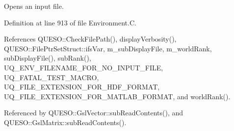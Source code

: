 Opens an input file. 



Definition at line 913 of file Environment.\-C.



References Q\-U\-E\-S\-O\-::\-Check\-File\-Path(), display\-Verbosity(), Q\-U\-E\-S\-O\-::\-File\-Ptr\-Set\-Struct\-::ifs\-Var, m\-\_\-sub\-Display\-File, m\-\_\-world\-Rank, sub\-Display\-File(), sub\-Rank(), U\-Q\-\_\-\-E\-N\-V\-\_\-\-F\-I\-L\-E\-N\-A\-M\-E\-\_\-\-F\-O\-R\-\_\-\-N\-O\-\_\-\-I\-N\-P\-U\-T\-\_\-\-F\-I\-L\-E, U\-Q\-\_\-\-F\-A\-T\-A\-L\-\_\-\-T\-E\-S\-T\-\_\-\-M\-A\-C\-R\-O, U\-Q\-\_\-\-F\-I\-L\-E\-\_\-\-E\-X\-T\-E\-N\-S\-I\-O\-N\-\_\-\-F\-O\-R\-\_\-\-H\-D\-F\-\_\-\-F\-O\-R\-M\-A\-T, U\-Q\-\_\-\-F\-I\-L\-E\-\_\-\-E\-X\-T\-E\-N\-S\-I\-O\-N\-\_\-\-F\-O\-R\-\_\-\-M\-A\-T\-L\-A\-B\-\_\-\-F\-O\-R\-M\-A\-T, and world\-Rank().



Referenced by Q\-U\-E\-S\-O\-::\-Gsl\-Vector\-::sub\-Read\-Contents(), and Q\-U\-E\-S\-O\-::\-Gsl\-Matrix\-::sub\-Read\-Contents().


